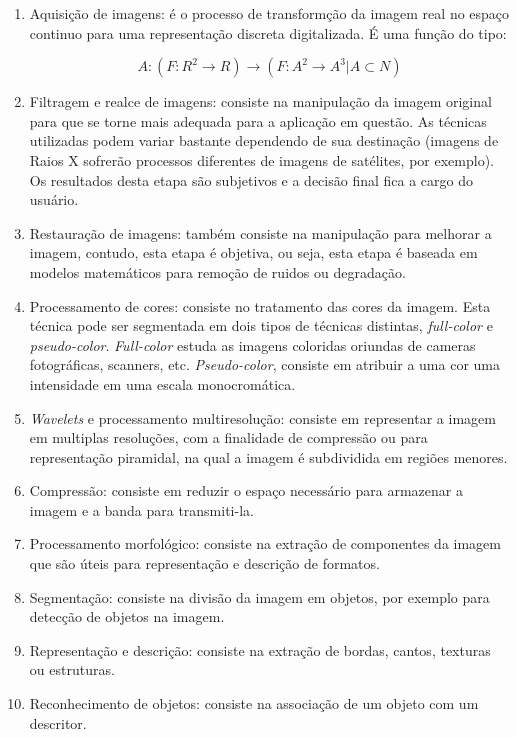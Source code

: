 \documentclass[10pt,a4paper]{article}
\begin{document}
\begin{enumerate}
 \item Aquisição de imagens: é o processo de transformção da imagem real no espaço continuo para uma representação discreta digitalizada. É uma função do tipo:

\[ A:(F:R^2\rightarrow R) \rightarrow  (F:A^2\rightarrow A^3 | A \subset N) \]

\item Filtragem e realce de imagens: consiste na manipulação da imagem original para que se torne mais adequada para a aplicação em questão. As técnicas utilizadas podem variar bastante dependendo de sua destinação (imagens de Raios X sofrerão processos diferentes de imagens de satélites, por exemplo). Os resultados desta etapa são subjetivos e a decisão final fica a cargo do usuário.

\item Restauração de imagens: também consiste na manipulação para melhorar a imagem, contudo, esta etapa é objetiva, ou seja, esta etapa é baseada em modelos matemáticos para remoção de ruidos ou degradação.

\item Processamento de cores: consiste no tratamento das cores da imagem. Esta técnica pode ser segmentada em dois tipos de técnicas distintas, \textit{full-color} e \textit{pseudo-color}. \textit{Full-color} estuda as imagens coloridas oriundas de cameras fotográficas, scanners, etc. \textit{Pseudo-color}, consiste em atribuir a uma cor uma intensidade em uma escala monocromática.

\item \textit{Wavelets} e processamento multiresolução: consiste em representar a imagem em multiplas resoluções, com a finalidade de compressão ou para representação piramidal, na qual a imagem é subdividida em regiões menores.

\item Compressão: consiste em reduzir o espaço necessário para armazenar a imagem e a banda para transmiti-la.

\item Processamento morfológico: consiste na extração de componentes da imagem que são úteis para representação e descrição de formatos.

\item Segmentação: consiste na divisão da imagem em objetos, por exemplo para detecção de objetos na imagem.

\item Representação e descrição: consiste na extração de bordas, cantos, texturas ou estruturas.

\item Reconhecimento de objetos: consiste na associação de um objeto com um descritor.
\end{enumerate}
\end{document}
